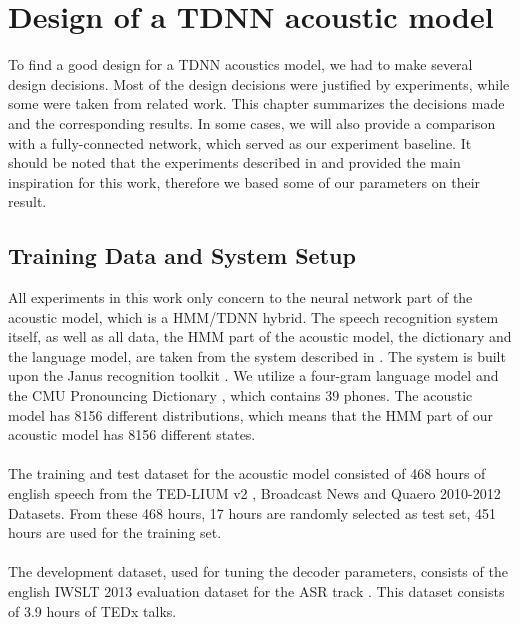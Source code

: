 

\chapter{Design of a TDNN acoustic model}
To find a good design for a TDNN acoustics model, we had to make several design decisions. Most of the design decisions were justified by experiments, while some were taken from related work. This chapter summarizes the decisions made and the corresponding results. In some cases, we will also provide a comparison with a fully-connected network, which served as our experiment baseline. It should be noted that the experiments described in \cite{peddinti2015jhu} and \cite{peddinti2015reverberation} provided the main inspiration for this work, therefore we based some of our parameters on their result. \\ 
\section{Training Data and System Setup}
All experiments in this work only concern to the neural network part of the acoustic model, which is a HMM/TDNN hybrid. The speech recognition system itself, as well as all data, the HMM part of the acoustic model, the dictionary and the language model, are taken from the system described in \cite{nguyen20162016}. The system is built upon the Janus recognition toolkit \cite{finke1997karlsruhe}. We utilize a four-gram language model and the CMU Pronouncing Dictionary \cite{cmudict}, which contains 39 phones. The acoustic model has 8156 different distributions, which means that the HMM part of our acoustic model has 8156 different states. \\ \\
The training and test dataset for the acoustic model consisted of 468 hours of english speech from the TED-LIUM v2 \cite{rousseau2014enhancing}, Broadcast News \cite{graff19971996} and Quaero 2010-2012 Datasets. From these 468 hours, 17 hours are randomly selected as test set, 451 hours are used for the training set. \\ \\
The development dataset, used for tuning the decoder parameters, consists of the english IWSLT 2013 evaluation dataset for the ASR track \cite{cettolo2013report}. This dataset consists of 3.9 hours of TEDx talks. 
